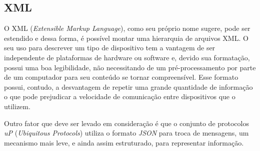 \subsection{XML}
O XML (\emph{Extensible Markup Language}), como seu próprio nome sugere, pode ser estendido e dessa forma, é possível montar uma hierarquia de arquivos XML. O seu uso para descrever um tipo de dispositivo tem a vantagem de ser independente de plataformas de hardware ou software e, devido sua formatação, possui uma boa legibilidade, não necessitando de um pré-processamento por parte de um computador para seu conteúdo se tornar compreensível. Esse formato possui, contudo, a desvantagem de repetir uma grande quantidade de informação o que pode prejudicar a velocidade de comunicação entre dispositivos que o utilizem.

Outro fator que deve ser levado em consideração é que o conjunto de protocolos \emph{uP} (\emph{Ubiquitous Protocols}) utiliza o formato \emph{JSON} para troca de mensagens, um mecanismo mais leve, e ainda assim estruturado, para representar informação.

